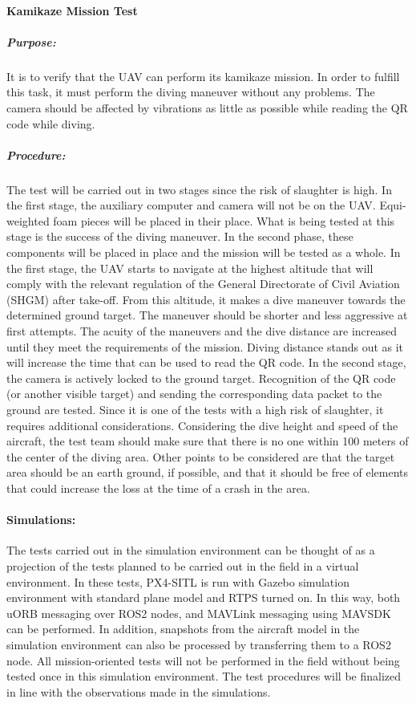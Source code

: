 \documentclass[12pt]{article}
\begin{document}
\paragraph{Kamikaze Mission Test}

\subparagraph*{Purpose:}
It is to verify that the UAV can perform its kamikaze mission. In order to fulfill this task, it must perform the diving maneuver without any problems. The camera should be affected by vibrations as little as possible while reading the QR code while diving.

\subparagraph*{Procedure:} The test will be carried out in two stages since the risk of slaughter is high. In the first stage, the auxiliary computer and camera will not be on the UAV. Equi-weighted foam pieces will be placed in their place. What is being tested at this stage is the success of the diving maneuver. In the second phase, these components will be placed in place and the mission will be tested as a whole.
In the first stage, the UAV starts to navigate at the highest altitude that will comply with the relevant regulation of the General Directorate of Civil Aviation (SHGM) after take-off. From this altitude, it makes a dive maneuver towards the determined ground target. The maneuver should be shorter and less aggressive at first attempts. The acuity of the maneuvers and the dive distance are increased until they meet the requirements of the mission. Diving distance stands out as it will increase the time that can be used to read the QR code.
In the second stage, the camera is actively locked to the ground target. Recognition of the QR code (or another visible target) and sending the corresponding data packet to the ground are tested.
Since it is one of the tests with a high risk of slaughter, it requires additional considerations. Considering the dive height and speed of the aircraft, the test team should make sure that there is no one within 100 meters of the center of the diving area. Other points to be considered are that the target area should be an earth ground, if possible, and that it should be free of elements that could increase the loss at the time of a crash in the area.

\paragraph{Simulations:} The tests carried out in the simulation environment can be thought of as a projection of the tests planned to be carried out in the field in a virtual environment. In these tests, PX4-SITL is run with Gazebo simulation environment with standard plane model and RTPS turned on. In this way, both uORB messaging over ROS2 nodes, and MAVLink messaging using MAVSDK can be performed. In addition, snapshots from the aircraft model in the simulation environment can also be processed by transferring them to a ROS2 node.
\justify
All mission-oriented tests will not be performed in the field without being tested once in this simulation environment. The test procedures will be finalized in line with the observations made in the simulations.
\end{document}

